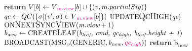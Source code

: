 \begin{algorithm}[h!]
\begin{algorithmic}[1]
			\EndIf
		\EndIf
		\color{black}
	\EndProcedure
	 \label{code_onreceivevote}
		\color{Green}
		 \label{code_checkleader}
			\color{black}
				\State \textbf{return}
			\EndIf
			\State $V[b] \gets V\textcolor{Magenta}{\textsubscript{m.view}}[b] \cup \{(v, m.partialSig)\}$
				\State $qc \gets QC(\{ \sigma | (v', \sigma) \in V\textcolor{Magenta}{\textsubscript{m.view}}[b]\})$
				\State $ \text{UPDATE{\large Q}C{\large H}IGH}(\textit{qc}) $
				\color{Green}
				\State $\text{ON{\large N}EXT{\large S}YNC{\large V}IEW}(\textit{m.view} + 1)$ \label{code_gotvotes}
				\color{black}
			\EndIf
		\EndIf
	\EndProcedure
	 \label{code_onpropose}
		\State $b\textsubscript{new} \gets \text{CREATE{\large L}EAF}(\textit{b\textsubscript{leaf}, \textit{cmd}, \textit{qc\textsubscript{high}}, \textit{b\textsubscript{leaf}.height} + 1})$
		\State $ \text{BROADCAST}(\text{MSG}\textsubscript{\textit{v}}(\text{GENERIC}, \textit{b\textsubscript{new}}, \textcolor{Magenta}{\textit{qc\textsubscript{high}}})) $ \label{code_propose}
		\State \textbf{return} b\textsubscript{new}
	\EndFunction
	\end{algorithmic}
\end{algorithm}

